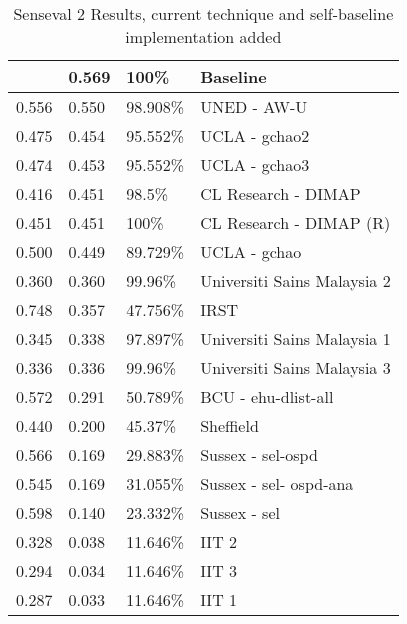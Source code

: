 \begin{table}[htp]
\begin{tabular}{|l|l|l|l|}
{{        0.569   &   0.569   &   100\%       &   Baseline \\ \hline         0.556
&   0.550   &   98.908\%    &   UNED - AW-U  \\ \hline         0.475   &   0.454
&   95.552\%    &   UCLA - gchao2 \\ \hline         0.474   &   0.453   &
95.552\%    &   UCLA - gchao3 \\ \hline         0.416   &   0.451   &   98.5\%
&   CL Research - DIMAP  \\ \hline         0.451   &   0.451   &   100\%       &
CL Research - DIMAP (R)  \\ \hline         0.500   &   0.449   &   89.729\%    &
UCLA - gchao \\ \hline         0.360   &   0.360   &   99.96\%     &
Universiti Sains Malaysia 2  \\ \hline         0.748   &   0.357   &   47.756\%
&   IRST \\ \hline         0.345   &   0.338   &   97.897\%    &   Universiti
Sains Malaysia 1 \\ \hline         0.336   &   0.336   &   99.96\%     &
Universiti Sains Malaysia 3 \\ \hline         0.572   &   0.291   &   50.789\%
&   BCU - ehu-dlist-all \\ \hline         0.440   &   0.200   &   45.37\%     &
Sheffield \\ \hline         0.566   &   0.169   &   29.883\%    &   Sussex -
sel-ospd \\ \hline         0.545   &   0.169   &   31.055\%    &   Sussex - sel-
ospd-ana \\ \hline         0.598   &   0.140   &   23.332\%    &   Sussex - sel
\\ \hline         0.328   &   0.038   &   11.646\%    &   IIT 2 \\ \hline
0.294   &   0.034   &   11.646\%    &   IIT 3 \\ \hline         0.287   &
0.033   &   11.646\%    &   IIT 1 \\ \hline     \end{tabular}
\caption{Senseval 2 Results, current technique and self-baseline implementation
added \label{table:SENSEVAL2RESULTS}} \end{table}

